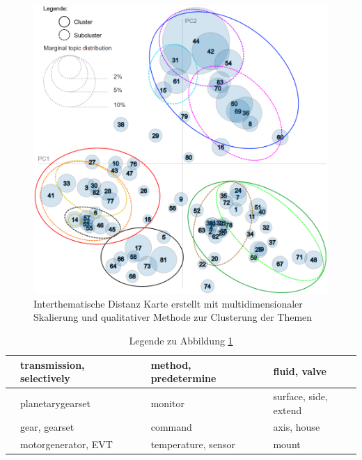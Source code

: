  
 \begin{figure}[H]
 	\centering
 	\includegraphics[width=\textwidth,keepaspectratio=true]{img/LDAvisGM-3-1-1_clustered_small.png}
 	\caption{
 		Interthematische Distanz Karte erstellt mit multidimensionaler Skalierung und qualitativer Methode zur Clusterung der Themen
 	}
 	\label{fig:Themengruppen_LDA_Unigramm}
 \end{figure}

\begin{table}[H]
	\centering
	\caption{Legende zu Abbildung \ref{fig:Themengruppen_LDA_Unigramm}}
	\label{table:Legend}
	\begin{tabular}{|l|l|l|l|l|l|}
		\hline
		\cellcolor{blue}& transmission, selectively & \cellcolor{red} & method, predetermine & \cellcolor{black} & fluid, valve \\
		\hline
		\cellcolor{violet}& planetarygearset & \cellcolor{orange} & monitor & \cellcolor{OliveGreen} & surface, side, extend \\
		\hline
		\cellcolor{magenta}& gear, gearset  & \cellcolor{yellow} & command & \cellcolor{green} & axis, house \\
		\hline
		\cellcolor{cyan}& motorgenerator, EVT & \cellcolor{gray} & temperature, sensor & \cellcolor{brown} & mount \\
		\hline
	\end{tabular}
\end{table}

